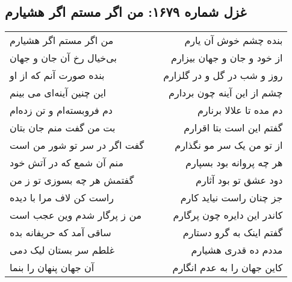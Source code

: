 \begin{center}
\section*{غزل شماره ۱۶۷۹: من اگر مستم اگر هشیارم}
\label{sec:1679}
\begin{longtable}{l p{0.5cm} r}
من اگر مستم اگر هشیارم
&&
بنده چشم خوش آن یارم
\\
بی‌خیال رخ آن جان و جهان
&&
از خود و جان و جهان بیزارم
\\
بنده صورت آنم که از او
&&
روز و شب در گل و در گلزارم
\\
این چنین آینه‌ای می بینم
&&
چشم از این آینه چون بردارم
\\
دم فروبسته‌ام و تن زده‌ام
&&
دم مده تا علالا برنارم
\\
بت من گفت منم جان بتان
&&
گفتم این است بتا اقرارم
\\
گفت اگر در سر تو شور من است
&&
از تو من یک سر مو نگذارم
\\
منم آن شمع که در آتش خود
&&
هر چه پروانه بود بسپارم
\\
گفتمش هر چه بسوزی تو ز من
&&
دود عشق تو بود آثارم
\\
راست کن لاف مرا با دیده
&&
جز چنان راست نیاید کارم
\\
من ز پرگار شدم وین عجب است
&&
کاندر این دایره چون پرگارم
\\
ساقی آمد که حریفانه بده
&&
گفتم اینک به گرو دستارم
\\
غلطم سر بستان لیک دمی
&&
مددم ده قدری هشیارم
\\
آن جهان پنهان را بنما
&&
کاین جهان را به عدم انگارم
\\
\end{longtable}
\end{center}
